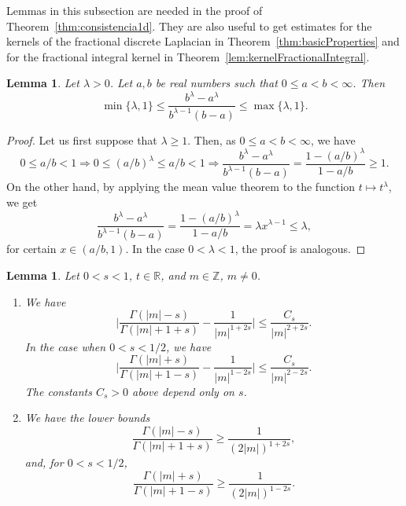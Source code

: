 \documentclass[a4paper,11pt,reqno]{amsart}
\newcommand{\R}{\mathbb{R}}
\newcommand{\Z}{\mathbb{Z}}
\newtheorem{lem}[thm]{Lemma}
\theoremstyle{definition}
\numberwithin{equation}{section}
\begin{document}
Lemmas in this subsection are needed in the proof of Theorem~\ref{thm:consistencia1d}.
They are also useful to get estimates for the kernels of the fractional discrete Laplacian
in Theorem~\ref{thm:basicProperties} and for the
fractional integral kernel in Theorem~\ref{lem:kernelFractionalIntegral}.

\begin{lem}
\label{lem:Mario}
Let $\lambda>0$. Let $a,b$ be real numbers such that $0\le a<b<\infty$. Then
\[
\min\{\lambda,1\}\le\frac{b^{\lambda}-a^{\lambda}}{b^{\lambda-1}(b-a)}\le \max\{\lambda,1\}.
\]
\end{lem}

\begin{proof}
Let us first suppose that $\lambda\ge1$. Then, as $0\le a<b<\infty$, we have
\[
0\le a/b<1\Rightarrow 0\le(a/b)^{\lambda}
\le a/b<1\Rightarrow \frac{b^{\lambda}-a^{\lambda}}{b^{\lambda-1}(b-a)}=\frac{1-(a/b)^{\lambda}}{1-a/b}\ge1.
\]
On the other hand, by applying the mean value theorem to the function $t\mapsto t^{\lambda}$, we get
\[
\frac{b^{\lambda}-a^{\lambda}}{b^{\lambda-1}(b-a)}=\frac{1-(a/b)^{\lambda}}{1-a/b}=\lambda x^{\lambda-1}\le \lambda,
\]
for certain $x\in (a/b,1)$. In the case $0<\lambda<1$, the proof is analogous.
\end{proof}

\begin{lem}
\label{eq:lowerBound}
Let $0<s<1$, $t\in \R$, and $m\in \Z$, $m\neq 0$.
\begin{enumerate}[$(a)$]
\item We have
\begin{equation}
\label{eq:lowerLap}
\bigg|\frac{\Gamma(|m|-s)}{\Gamma(|m|+1+s)}-\frac{1}{|m|^{1+2s}}\bigg|\le \frac{C_{s}}{|m|^{2+2s}}.
\end{equation}
In the case when $0<s<1/2$, we have
\begin{equation}
\label{eq:lowerFrac}
\bigg|\frac{\Gamma(|m|+s)}{\Gamma(|m|+1-s)}-\frac{1}{|m|^{1-2s}}\bigg|\le \frac{C_{s}}{|m|^{2-2s}}.
\end{equation}
The constants $C_s>0$ above depend only on $s$.
\item We have the lower bounds
\[
\frac{\Gamma(|m|-s)}{\Gamma(|m|+1+s)}\ge\frac{1}{(2|m|)^{1+2s}},
\]
and, for $0<s<1/2$,
\[
\frac{\Gamma(|m|+s)}{\Gamma(|m|+1-s)}\ge\frac{1}{(2|m|)^{1-2s}}.
\]

\end{enumerate}
\end{lem}
\end{document}
